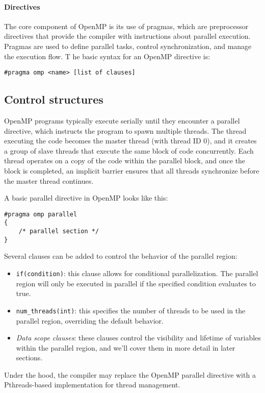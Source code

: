 \paragraph*{Directives}
The core component of OpenMP is its use of pragmas, which are preprocessor directives that provide the compiler with instructions about parallel execution. 
Pragmas are used to define parallel tasks, control synchronization, and manage the execution flow. T
he basic syntax for an OpenMP directive is:
\begin{lstlisting}[style=C]
#pragma omp <name> [list of clauses]
\end{lstlisting}

\subsection{Control structures}
OpenMP programs typically execute serially until they encounter a parallel directive, which instructs the program to spawn multiple threads. 
The thread executing the code becomes the master thread (with thread ID 0), and it creates a group of slave threads that execute the same block of code concurrently. 
Each thread operates on a copy of the code within the parallel block, and once the block is completed, an implicit barrier ensures that all threads synchronize before the master thread continues.

A basic parallel directive in OpenMP looks like this:
\begin{lstlisting}[style=C]
#pragma omp parallel 
{
    /* parallel section */
}
\end{lstlisting}
Several clauses can be added to control the behavior of the parallel region:
\begin{itemize}
    \item \texttt{if(condition)}: this clause allows for conditional parallelization. 
        The parallel region will only be executed in parallel if the specified condition evaluates to true.
    \item \texttt{num\_threads(int)}: this specifies the number of threads to be used in the parallel region, overriding the default behavior.
    \item \textit{Data scope clauses}: these clauses control the visibility and lifetime of variables within the parallel region, and we'll cover them in more detail in later sections.
\end{itemize}
Under the hood, the compiler may replace the OpenMP parallel directive with a Pthreads-based implementation for thread management.

